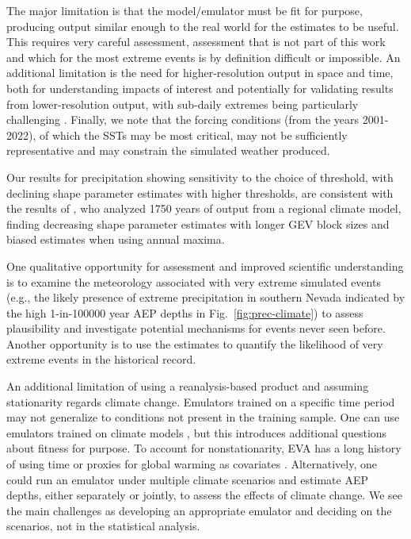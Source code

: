 \documentclass{ametsocV6.1}
\begin{document}
The major limitation is that the model/emulator must be fit for purpose, producing output similar enough to the real world for the estimates to be useful. This requires very careful assessment, assessment that is not part of this work and which for the most extreme events is by definition difficult or impossible. An additional limitation is the need for higher-resolution output in space and time, both for understanding impacts of interest and potentially for validating results from lower-resolution output, with sub-daily extremes being particularly challenging \citep{nasem2024pmp}. Finally, we note that the forcing conditions (from the years 2001-2022), of which the SSTs may be most critical, may not be sufficiently representative and may constrain the simulated weather produced.

Our results for precipitation showing sensitivity to the choice of threshold, with declining shape parameter estimates with higher thresholds, are consistent with the results of \cite{ben2020evaluation}, who analyzed 1750 years of output from a regional climate model, finding decreasing shape parameter estimates with longer GEV block sizes and biased estimates when using annual maxima. 

One qualitative opportunity for assessment and improved scientific understanding  is to examine the meteorology associated with very extreme simulated events (e.g., the likely presence of extreme precipitation in southern Nevada indicated by the high 1-in-100000 year AEP depths in Fig.\ \ref{fig:prec-climate}) to assess plausibility and investigate potential mechanisms for events never seen before. Another opportunity is to use the estimates to quantify the likelihood of very extreme events in the historical record.

An additional limitation of using a reanalysis-based product and assuming stationarity regards climate change. Emulators trained on a specific time period may not generalize to conditions not present in the training sample. One can use emulators trained on climate models \citep[e.g.,][]{watt2025ace2}, but this introduces additional questions about fitness for purpose. To account for nonstationarity, EVA has a long history of using time or proxies for global warming as covariates \citep{coles2001introduction,westra2013global,risser2019probabilistic}. Alternatively, one could run an emulator under multiple climate scenarios and estimate AEP depths, either separately or jointly, to assess the effects of climate change. We see the main challenges as developing an appropriate emulator and deciding on the scenarios, not in the statistical analysis.
\end{document}
